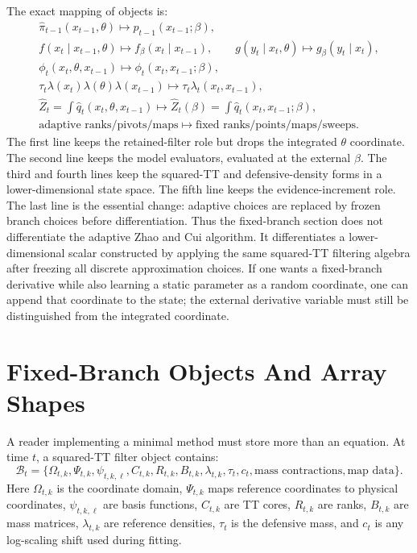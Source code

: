 \documentclass[11pt]{article}
\numberwithin{equation}{section}
\begin{document}
The exact mapping of objects is:
\begin{equation}
\begin{gathered}
\widehat\pi_{t-1}(x_{t-1},\theta)
\mapsto
\widehat p_{t-1}(x_{t-1};\beta),\\
f(x_t\mid x_{t-1},\theta)\mapsto f_\beta(x_t\mid x_{t-1}),
\qquad
g(y_t\mid x_t,\theta)\mapsto g_\beta(y_t\mid x_t),\\
\phi_t(x_t,\theta,x_{t-1})
\mapsto
\phi_t(x_t,x_{t-1};\beta),\\
\tau_t\lambda(x_t)\lambda(\theta)\lambda(x_{t-1})
\mapsto
\tau_t\lambda_t(x_t,x_{t-1}),\\
\widehat Z_t
=
\int\widehat q_t(x_t,\theta,x_{t-1})
\mapsto
\widehat Z_t(\beta)
=
\int\widehat q_t(x_t,x_{t-1};\beta),\\
\text{adaptive ranks/pivots/maps}
\mapsto
\text{fixed ranks/points/maps/sweeps}.
\end{gathered}
\label{eq:p24-r3}
\end{equation}
The first line keeps the retained-filter role but drops the integrated
\(\theta\) coordinate.  The second line keeps the model evaluators, evaluated at
the external \(\beta\).  The third and fourth lines keep the squared-TT and
defensive-density forms in a lower-dimensional state space.  The fifth line
keeps the evidence-increment role.  The last line is the essential change:
adaptive choices are replaced by frozen branch choices before differentiation.
Thus the fixed-branch section does not differentiate the adaptive Zhao and Cui \cite{zhao2024ttsequential}
algorithm.  It differentiates a lower-dimensional scalar constructed by applying
the same squared-TT filtering algebra after freezing all discrete approximation
choices.  If one wants a fixed-branch derivative while also learning a static
parameter as a random coordinate, one can append that coordinate to the state;
the external derivative variable must still be distinguished from the
integrated coordinate.

\section{Fixed-Branch Objects And Array Shapes}

A reader implementing a minimal method must store more than an equation.  At
time \(t\), a squared-TT filter object contains:
\[
    \mathcal B_t
    =
    \{
    \Omega_{t,k},\Psi_{t,k},\psi_{t,k,\ell},C_{t,k},
    R_{t,k},B_{t,k},\lambda_{t,k},\tau_t,c_t,
    \text{mass contractions},\text{map data}
    \}.
\]
Here \(\Omega_{t,k}\) is the coordinate domain, \(\Psi_{t,k}\) maps reference
coordinates to physical coordinates, \(\psi_{t,k,\ell}\) are basis functions,
\(C_{t,k}\) are TT cores, \(R_{t,k}\) are ranks, \(B_{t,k}\) are mass matrices,
\(\lambda_{t,k}\) are reference densities, \(\tau_t\) is the defensive mass, and
\(c_t\) is any log-scaling shift used during fitting.
\end{document}
